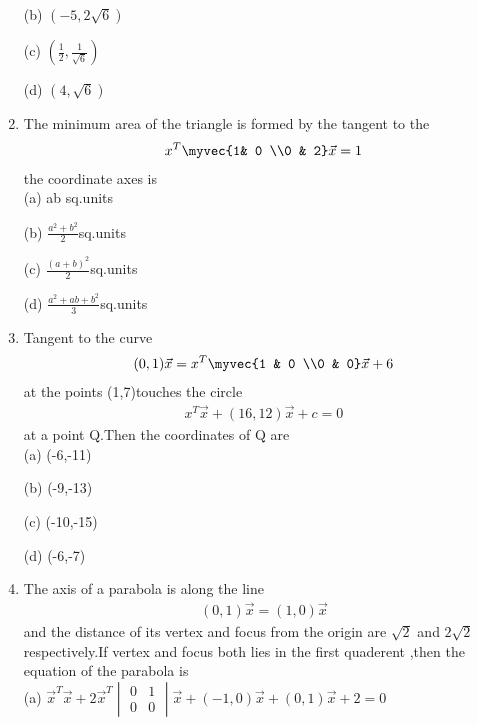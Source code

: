\begin{enumerate}
    \choice (b) $(-5,2\sqrt{6})$
    
    \choice (c) $(\frac{1}{2},\frac{1}{\sqrt{6}})$
    
    \choice (d) $(4,\sqrt{6})$\\
    
\item The minimum area of the triangle is formed by the tangent to the \begin{align}x^T \myvec{1& 0 \\0 & 2} \vec x=1 \end{align} the coordinate axes is \\
    
    \choice (a) ab sq.units
    
    \choice (b) ${\frac{a^2+b^2}{2}}$sq.units 
    
    \choice (c) ${\frac{(a+b)^2}{2}}$sq.units 
    
    \choice (d) $\frac{a^2+ab+b^2}{3}$sq.units\\
    
    \item Tangent to the curve \begin{align}(0,1)\vec x= x^T\myvec {1 & 0 \\0 & 0}\vec x+ 6\end{align} at the points (1,7)touches the circle \begin{align} x^T \vec x+(16,12)\vec x+c=0\end{align}at a point Q.Then the coordinates of Q are \\
    
    \choice (a) (-6,-11)
    
    \choice (b) (-9,-13)
    
    \choice (c) (-10,-15)
    
    \choice (d) (-6,-7)\\
    
    \item The axis of a parabola is along the line \begin{align}(0,1)\vec x= (1,0)\vec x\end{align} and the distance of its vertex and focus from the origin are $\sqrt{2}$ and $2\sqrt{2}$ respectively.If vertex and focus both lies in the first quaderent ,then the equation of the parabola is \\
    
    \choice (a) $\vec x^T\vec x+2\vec x^T\begin{vmatrix} 0&1\\0&0 \end{vmatrix} \vec x+(-1,0)\vec x+(0,1)\vec x+2=0$
    

\end{enumerate}
